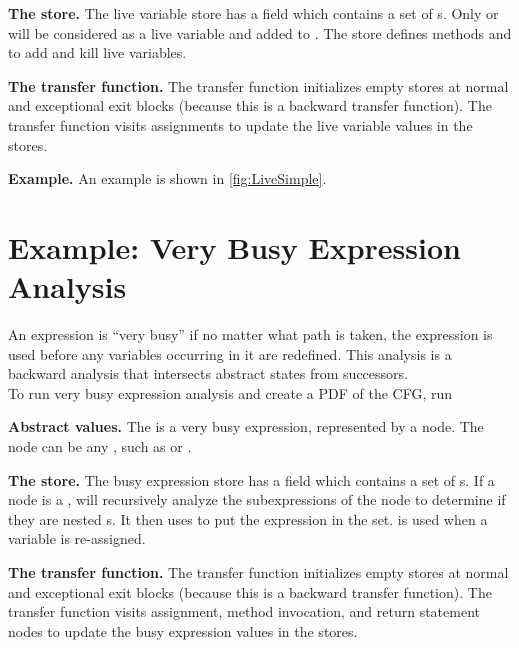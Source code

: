 \textbf{The store.} The live variable store  has a field
 which contains a set of s. Only
 or  will be considered as a
live variable and added to . The store defines methods
 and  to add
and kill live variables.

\textbf{The transfer function.} The transfer function 
initializes empty stores at normal and exceptional exit blocks (because this
is a backward transfer function). The transfer function visits assignments to
update the live variable values in the stores.

\textbf{Example.} An example is shown in \autoref{fig:LiveSimple}.


\section{Example: Very Busy Expression Analysis}

An expression is ``very busy'' if no matter what path is taken,
the expression is used before any variables occurring in it are redefined.
This analysis is a backward analysis that intersects abstract states from successors.
\\
To run very busy expression analysis and create a PDF of the CFG, run \\

\textbf{Abstract values.} The  is a very busy expression, represented by a node.
The node can be any , such as 
or .

\textbf{The store.} The busy expression store  has a field
 which contains a set of s.
If a node is a , 
will recursively analyze the subexpressions of the node to determine
if they are nested s. It then uses 
to put the expression in the set.  is used when a variable is re-assigned.

\textbf{The transfer function.} The transfer function 
initializes empty stores at normal and exceptional exit blocks (because this
is a backward transfer function). The transfer function visits assignment, method invocation,
and return statement nodes to update the busy expression values in the stores.

